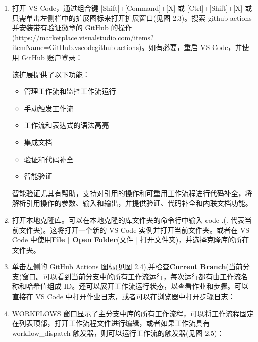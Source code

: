 \begin{enumerate}
\item 
打开 VS Code，通过组合键 [Shift]+[Command]+[X] 或 [Ctrl]+[Shift]+[X] 或只需单击左侧栏中的扩展图标来打开扩展窗口(见图 2.3)。搜索 github actions 并安装带有验证徽章的 GitHub 的操作(\url{https://marketplace.visualstudio.com/items?itemName=GitHub.vscodegithub-actions})。如有必要，重启 VS Code，并使用 GitHub 账户登录：


该扩展提供了以下功能：

\begin{itemize}
\item 
管理工作流和监控工作流运行

\item 
手动触发工作流

\item 
工作流和表达式的语法高亮

\item 
集成文档

\item 
验证和代码补全

\item 
智能验证
\end{itemize}

智能验证尤其有帮助，支持对引用的操作和可重用工作流程进行代码补全，将解析引用操作的参数、输入和输出，并提供验证、代码补全和内联文档功能。

\item 
打开本地克隆库。可以在本地克隆的库文件夹的命令行中输入 code .(. 代表当前文件夹)。这将打开一个新的 VS Code 实例并打开当前文件夹。或者在 VS Code 中使用\textbf{File | Open Folder}(文件 | 打开文件夹)，并选择克隆库的所在文件夹。

\item 
单击左侧的 GitHub Actions 图标(见图 2.4),并检查\textbf{Current Branch}(当前分支)窗口。可以看到当前分支中的所有工作流运行，每次运行都有由工作流名称和哈希值组成 ID。还可以展开工作流运行状态，以查看作业和步骤。可以直接在 VS Code 中打开作业日志，或者可以在浏览器中打开步骤日志：


\item 
WORKFLOWS 窗口显示了主分支中库的所有工作流程，可以将工作流程固定在列表顶部，打开工作流程文件进行编辑，或者如果工作流具有 workflow\_dispatch 触发器，则可以运行工作流的触发器(见图 2.5)：


\end{enumerate}
